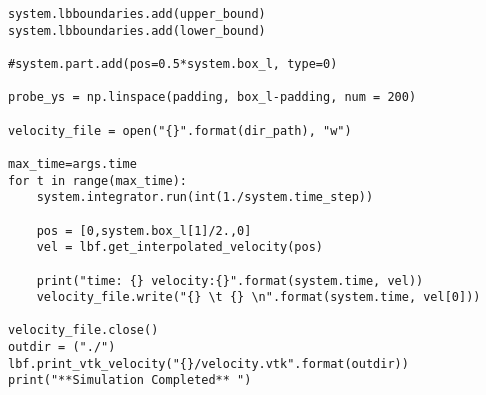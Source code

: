 \documentclass[a4paper,10pt,bibtotoc]{scrartcl}
\begin{document}
\begin{lstlisting}
system.lbboundaries.add(upper_bound)
system.lbboundaries.add(lower_bound)

#system.part.add(pos=0.5*system.box_l, type=0)

probe_ys = np.linspace(padding, box_l-padding, num = 200)

velocity_file = open("{}".format(dir_path), "w")

max_time=args.time
for t in range(max_time):
    system.integrator.run(int(1./system.time_step))
    
    pos = [0,system.box_l[1]/2.,0]
    vel = lbf.get_interpolated_velocity(pos)

    print("time: {} velocity:{}".format(system.time, vel))
    velocity_file.write("{} \t {} \n".format(system.time, vel[0]))

velocity_file.close()
outdir = ("./")
lbf.print_vtk_velocity("{}/velocity.vtk".format(outdir))
print("**Simulation Completed** ")
\end{lstlisting}
\end{document}
